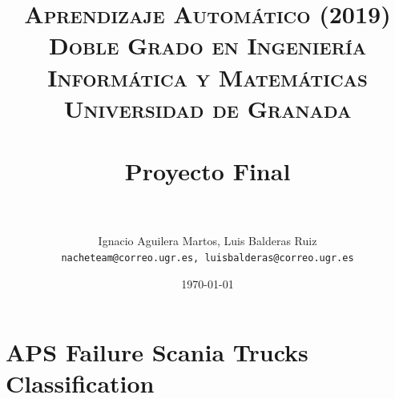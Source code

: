 
\graphicspath{ {./images/} }
\usepackage{subcaption}
\usepackage{hyperref}
\usepackage{soul}

\setlength{\parskip}{10px}



\title{	
\normalfont \normalsize 
\textsc{\textbf{Aprendizaje Automático (2019)} \\ Doble Grado en Ingeniería Informática y Matemáticas \\ Universidad de Granada} \\ [25pt] %
\horrule{0.5pt} \\[0.4cm] %
\huge Proyecto Final \\ %
\horrule{2pt} \\[0.5cm] %
}

\author{Ignacio Aguilera Martos, Luis Balderas Ruiz \\ \texttt{nacheteam@correo.ugr.es, luisbalderas@correo.ugr.es}} 


\date{\normalsize\today} %




\maketitle %

\newpage %

\tableofcontents %

\listoffigures

\listoftables

\newpage



\section{APS Failure Scania Trucks Classification}

